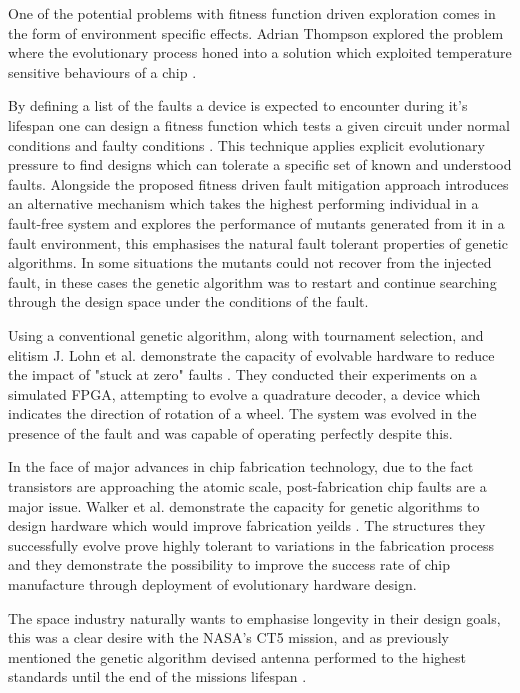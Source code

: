 One of the potential problems with fitness function driven exploration comes in
the form of environment specific effects. Adrian Thompson explored the problem
where the evolutionary process honed into a solution which exploited temperature
sensitive behaviours of a chip \cite{10.1007/BFb0057603}.

By defining a list of the faults a device is expected to encounter during it's
lifespan one can design a fitness function which tests a given circuit under
normal conditions and faulty conditions \cite{651463}\cite{Keymeulen2000}. This technique applies explicit
evolutionary pressure to find designs which can tolerate a specific set of
known and understood faults. Alongside the proposed fitness driven fault mitigation
approach \cite{Keymeulen2000} introduces an alternative mechanism which takes the
highest performing individual in a fault-free system and explores the performance
of mutants generated from it in a fault environment, this emphasises the natural
fault tolerant properties of genetic algorithms. In some situations the mutants
could not recover from the injected fault, in these cases the genetic algorithm
was to restart and continue searching through the design space under the conditions
of the fault.

Using a conventional genetic algorithm, along with tournament selection, and elitism
J. Lohn et al. demonstrate the capacity
of evolvable hardware to reduce the impact of "stuck at zero" faults \cite{10.1007/3-540-36553-2_5}. They
conducted their experiments on a simulated FPGA, attempting to evolve a quadrature
decoder, a device which indicates
the direction of rotation of a wheel. The system was evolved in the presence
of the fault and was capable of operating perfectly despite this.

In the face of major advances in chip fabrication technology, due to the fact transistors
are
approaching the atomic scale, post-fabrication chip faults are a major issue. Walker et al.
demonstrate the capacity for genetic algorithms to design hardware which would
improve fabrication yeilds \cite{10.1007/978-3-540-85857-7_27}. The structures
they successfully evolve prove highly tolerant to variations in the fabrication process
and they demonstrate the possibility to improve the success rate of chip manufacture
through deployment of evolutionary hardware design.

The space industry naturally wants to emphasise longevity in their design goals,
this was a clear desire with the NASA's CT5 mission, and as previously mentioned
the genetic algorithm devised antenna performed to the highest standards until the
end of the missions lifespan \cite{Antenna}.

